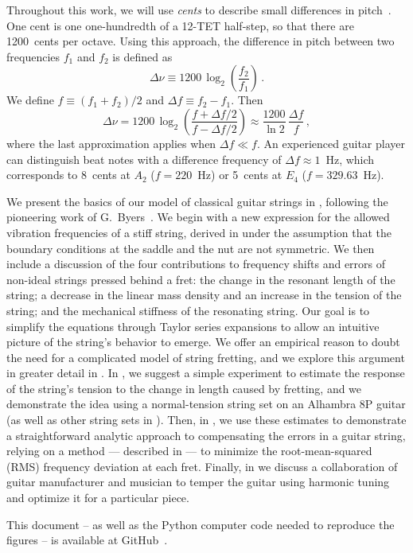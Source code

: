 Throughout this work, we will use \emph{cents} to describe small differences in pitch~\cite{ref:durfee2015pms}. One cent is one one-hundredth of a 12-TET half-step, so that there are 1200~cents per octave. Using this approach, the difference in pitch between two frequencies $f_1$ and $f_2$ is defined as
 \begin{equation} \label{eqn:cents_def}
\Delta \nu \equiv 1200\, \log_2\left(\frac{f_2}{f_1}\right)\, .
 \end{equation}
We define $f \equiv (f_1 + f_2) / 2$ and $\Delta f \equiv f_2 - f_1$. Then
 \begin{equation} \label{eqn:cents_approx}
\Delta \nu = 1200\, \log_2\left(\frac{f + \Delta f / 2}{f - \Delta f /2}\right) \approx \frac{1200}{\ln 2}\, \frac{\Delta f}{f}\, ,
 \end{equation}
where the last approximation applies when $\Delta f \ll f$. An experienced guitar player can distinguish beat notes with a difference frequency of $\Delta f \approx 1$~Hz, which corresponds to 8~cents at $A_2$ ($f = 220$~Hz) or 5~cents at $E_4$ ($f = 329.63$~Hz).

We present the basics of our model of classical guitar strings in , following the pioneering work of G.\ Byers~\cite{ref:byers1996cgi,ref:byersweb}. We begin with a new expression for the allowed vibration frequencies of a stiff string, derived in  under the assumption that the boundary conditions at the saddle and the nut are not symmetric. We then include a discussion of the four contributions to frequency shifts and errors of non-ideal strings pressed behind a fret: the change in the resonant length of the string; a decrease in the linear mass density and an increase in the tension of the string; and the mechanical stiffness of the resonating string. Our goal is to simplify the equations through Taylor series expansions to allow an intuitive picture of the string's behavior to emerge. We offer an empirical reason to doubt the need for a complicated model of string fretting, and we explore this argument in greater detail in . In , we suggest a simple experiment to estimate the response of the string's tension to the change in length caused by fretting, and we demonstrate the idea using a normal-tension string set on an Alhambra 8P guitar (as well as other string sets in ). Then, in , we use these estimates to demonstrate a straightforward analytic approach to compensating the errors in a guitar string, relying on a method --- described in  --- to minimize the root-mean-squared (RMS) frequency deviation at each fret. Finally, in  we discuss a collaboration of guitar manufacturer and musician to temper the guitar using harmonic tuning and optimize it for a particular piece.

This document -- as well as the Python computer code needed to reproduce the figures -- is available at GitHub~\cite{ref:github2021rgb}. 
